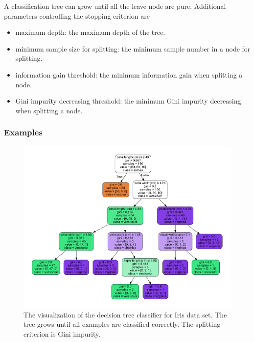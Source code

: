 \begin{refsection}
\begin{remark}
A classification tree can grow until all the leave node are pure. Additional parameters controlling the stopping criterion are
\begin{itemize}
	\item maximum depth: the maximum depth of the tree.
	\item minimum sample size for splitting: the minimum sample number in a node for splitting.
	\item information gain threshold: the minimum information gain when splitting a node. 
	\item Gini impurity decreasing threshold: the minimum Gini impurity decreasing when splitting a node.
\end{itemize}	
\end{remark}



\subsubsection{Examples}


\begin{figure}[H]
	\centering
	\includegraphics[width=0.8\linewidth]{../figures/statisticalLearning/treeMethods/IrisDecisionTree_Gini}
	\caption{The visualization of the decision tree classifier for Iris data set. The tree grows until all examples are classified correctly. The splitting criterion is Gini impurity. }
	\label{fig:irisdecisiontreegini}
\end{figure}


\end{refsection}
